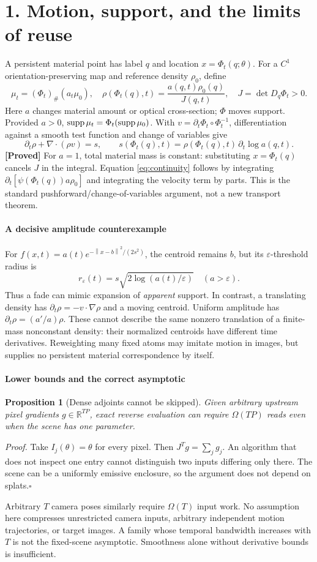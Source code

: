\documentclass[11pt,letterpaper]{article}
\newcommand{\R}{\mathbb R}\newcommand{\1}{\mathbf 1}
\newcommand{\norm}[1]{\left\lVert#1\right\rVert}
\newcommand{\status}[1]{\textsf{\textbf{[#1]}}}
\newcommand{\pagehead}[2]{\newpage\section*{#1}\vspace{-3pt}{\small\sffamily\color{ink}#2}\par\vspace{4pt}}
\newcommand{\mini}[1]{\paragraph{#1}}
\newtheorem{prop}{Proposition}
\newcommand{\briefproof}[1]{\textit{Proof.} #1\hfill$\square$\par}
\begin{document}
\pagehead{1. Motion, support, and the limits of reuse}{FOUNDATIONS / GEOMETRY IS NOT TEMPORAL BRIGHTNESS}
A persistent material point has label $q$ and location $x=\Phi_t(q;\theta)$. For a $C^1$ orientation-preserving map and reference density $\rho_0$, define
\begin{equation}
 \mu_t=(\Phi_t)_\#(a_t\mu_0),\quad
 \rho(\Phi_t(q),t)=\frac{a(q,t)\rho_0(q)}{J(q,t)},\quad
 J=\det D_q\Phi_t>0. \label{eq:transport}
\end{equation}
Here $a$ changes material amount or optical cross-section; $\Phi$ moves support. Provided $a>0$, $\operatorname{supp}\mu_t=\Phi_t(\operatorname{supp}\mu_0)$. With $v=\partial_t\Phi_t\circ\Phi_t^{-1}$, differentiation against a smooth test function and change of variables give
\begin{equation}
 \partial_t\rho+\nabla\!\cdot(\rho v)=s,\qquad
 s(\Phi_t(q),t)=\rho(\Phi_t(q),t)\,\partial_t\log a(q,t).
 \label{eq:continuity}
\end{equation}
\status{Proved} For $a=1$, total material mass is constant: substituting $x=\Phi_t(q)$ cancels $J$ in the integral. Equation \eqref{eq:continuity} follows by integrating $\partial_t[\psi(\Phi_t(q))a\rho_0]$ and integrating the velocity term by parts. This is the standard pushforward/change-of-variables argument, not a new transport theorem.

\mini{A decisive amplitude counterexample}
For $f(x,t)=a(t)e^{-\norm{x-b}^2/(2s^2)}$, the centroid remains $b$, but its $\varepsilon$-threshold radius is
\begin{equation}
 r_\varepsilon(t)=s\sqrt{2\log(a(t)/\varepsilon)}\quad(a>\varepsilon).
\end{equation}
Thus a fade can mimic expansion of \emph{apparent} support. In contrast, a translating density has $\partial_t\rho=-v\cdot\nabla\rho$ and a moving centroid. Uniform amplitude has $\partial_t\rho=(a'/a)\rho$. These cannot describe the same nonzero translation of a finite-mass nonconstant density: their normalized centroids have different time derivatives. Reweighting many fixed atoms may imitate motion in images, but supplies no persistent material correspondence by itself.

\mini{Lower bounds and the correct asymptotic}
\begin{prop}[Dense adjoints cannot be skipped]
Given arbitrary upstream pixel gradients $g\in\R^{TP}$, exact reverse evaluation can require $\Omega(TP)$ reads even when the scene has one parameter.
\end{prop}
\briefproof{Take $I_j(\theta)=\theta$ for every pixel. Then $J^Tg=\sum_jg_j$. An algorithm that does not inspect one entry cannot distinguish two inputs differing only there. The scene can be a uniformly emissive enclosure, so the argument does not depend on splats.}
Arbitrary $T$ camera poses similarly require $\Omega(T)$ input work. No assumption here compresses unrestricted camera inputs, arbitrary independent motion trajectories, or target images. A family whose temporal bandwidth increases with $T$ is not the fixed-scene asymptotic. Smoothness alone without derivative bounds is insufficient.
\end{document}
